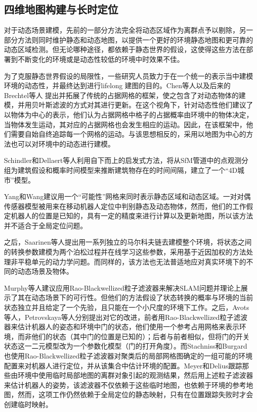 \subsection{四维地图构建与长时定位}
\label{subsec:4Dmapping}
\newpage
对于动态场景建模，先前的一部分方法完全将动态区域作为离群点予以剔除，另一部分方法则同时维护静态和动态地图，以提供一个更好的环境静态地图和更可靠的动态区域检测。但无论哪种途径，都依赖于静态世界的假设，这使得这些方法在部署到不断变化的环境或是动态性较低的环境中时效果不佳。

为了克服静态世界假设的局限性，一些研究人员致力于在一个统一的表示当中建模环境的动态性，并最终达到进行lifelong 建图的目的。Chen等人\cite{Chen2006Dynamic}以及后来的Brechtel等人\cite{Brechtel2010Recursive} 提出并拓展了传统的占据网格的框架，使之包含了对动态物体的建模，并用贝叶斯滤波的方式对其进行更新。在这个视角下，针对动态性他们建议了以物体为中心的表示，他们认为占据网格中格子的占据概率由环境中的物体决定，当物体发生运动，其对应的占据网格也会发生相应的运动。因此，在该框架中，他们需要自始自终追踪每一个网格的运动。与该思想相反的，采用以地图为中心的方法也可以对环境中的动态进行建模。

Schindler和Dellaert等人\cite{Schindler2010Probabilistic}利用自下而上的启发式方法，将从SfM管道中的点观测分组为建筑假设和概率时间模型来推断建筑物存在的时间间隔，建立了一个“4D城市”模型。

Yang和Wang\cite{Yang2011Feasibility}建议用一个“可能性”网格来同时表示静态区域和动态区域。一对对偶传感器模型被用来在移动机器人定位中判别静态及动态物体，然而，他们的工作假定机器人的位置是已知的，具有一定的精度来进行计算以及更新地图，所以该方法并不适合于全局定位问题。

之后，Saarinen\cite{Saarinen2012Independent}等人提出用一系列独立的马尔科夫链去建模整个环境，将状态之间的转换参数建模为两个泊松过程并在线学习这些参数，采用基于近因加权的方法处理非平稳单元的动力学问题。而同样的，该方法也无法普适地应对真实环境下的不同的动态场景及物体。

Murphy\cite{Murphy1999Bayesian}等人建议应用Rao-Blackwellized粒子滤波器来解决SLAM问题并理论上展示了其在动态场景下的可行性。但他们的方法假设了状态转换的概率与环境的当前状态独立并且给定了一个先验，且只能在一个小尺度的环境下工作。之后，Avots等人\cite{Avots2002A}，Petrovskaya\cite{Petrovskaya2007Probabilistic}等人分别提出对它的改进，前者用Rao-Blackwellized粒子滤波器来估计机器人的姿态和环境中门的状态，他们使用一个参考占用网格来表示环境，而非他们的状态（其中门的位置是已知的）；后者与前者相似，但将门的开关状态这一二元模型改为一个参数化模型（门的打开角度）。而Stachniss和Burgard\cite{Stachniss2005Mobile}也使用Rao-Blackwellized粒子滤波器对聚类后的局部网格图确定的一组可能的环境配置来对机器人进行定位，并从该集合中估计环境的配置。Meyer和Delius\cite{Meyer2010Temporary}跟踪那些由环境中使用临时局部地图的离群对象引起的观测结果，然后用上述粒子滤波器来估计机器人的姿势，该滤波器不仅依赖于这些临时地图，也依赖于环境的参考地图，然而，这项工作仍然依赖于全局定位的静态映射，只有在位置跟踪失败时才会创建临时映射。


